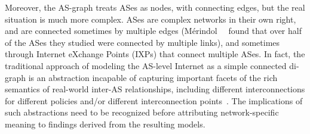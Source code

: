 Moreover, the AS-graph treats ASes as nodes, with connecting edges,
but the real situation is much more complex. ASes are complex networks
in their own right, and are connected sometimes by multiple edges
(M{\'e}rindol~\etal~\cite{merindol09:_quant_ases} found that
over half of the ASes they studied were connected by multiple links),
and sometimes through Internet eXchange Points (IXPs) that connect
multiple ASes. In fact, the traditional approach of modeling the
AS-level Internet as a simple connected di-graph is an abstraction
incapable of capturing important facets of the rich semantics of
real-world inter-AS relationships, including different
interconnections for different policies and/or different
interconnection
points~\cite{muehlbauer06:_build_as,muehlbauer07:_in_search}. The
implications of such abstractions need to be recognized before
attributing network-specific meaning to findings derived from the
resulting models.






